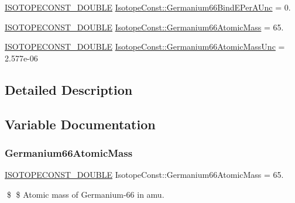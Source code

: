 \begin{DoxyCompactItemize}
\mbox{\hyperlink{group___isotope_const-_macros_ga8f45a7272ce02c0b4c65c44636ed719a}{I\+S\+O\+T\+O\+P\+E\+C\+O\+N\+S\+T\+\_\+\+D\+O\+U\+B\+LE}} \mbox{\hyperlink{group___isotope_const-_germanium-_ge66_gab543125467c26ff35900fa6669d9f9ea}{Isotope\+Const\+::\+Germanium66\+Bind\+E\+Per\+A\+Unc}} = 0.
\item 
\mbox{\hyperlink{group___isotope_const-_macros_ga8f45a7272ce02c0b4c65c44636ed719a}{I\+S\+O\+T\+O\+P\+E\+C\+O\+N\+S\+T\+\_\+\+D\+O\+U\+B\+LE}} \mbox{\hyperlink{group___isotope_const-_germanium-_ge66_gac93a32e5a1c1e02e574a191cc02683c7}{Isotope\+Const\+::\+Germanium66\+Atomic\+Mass}} = 65.
\item 
\mbox{\hyperlink{group___isotope_const-_macros_ga8f45a7272ce02c0b4c65c44636ed719a}{I\+S\+O\+T\+O\+P\+E\+C\+O\+N\+S\+T\+\_\+\+D\+O\+U\+B\+LE}} \mbox{\hyperlink{group___isotope_const-_germanium-_ge66_ga51ac44dc82533961b9f65b55d238b0d5}{Isotope\+Const\+::\+Germanium66\+Atomic\+Mass\+Unc}} = 2.\+577e-\/06
\end{DoxyCompactItemize}


\subsection{Detailed Description}


\subsection{Variable Documentation}
\mbox{\label{group___isotope_const-_germanium-_ge66_gac93a32e5a1c1e02e574a191cc02683c7}} 
\subsubsection{\texorpdfstring{Germanium66\+Atomic\+Mass}{Germanium66AtomicMass}}
{\footnotesize\ttfamily \mbox{\hyperlink{group___isotope_const-_macros_ga8f45a7272ce02c0b4c65c44636ed719a}{I\+S\+O\+T\+O\+P\+E\+C\+O\+N\+S\+T\+\_\+\+D\+O\+U\+B\+LE}} Isotope\+Const\+::\+Germanium66\+Atomic\+Mass = 65.}

\$ \$ Atomic mass of Germanium-\/66 in amu. \mbox{\label{group___isotope_const-_germanium-_ge66_ga51ac44dc82533961b9f65b55d238b0d5}} 
